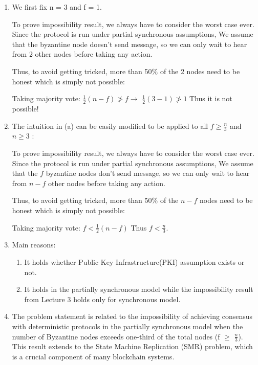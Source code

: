 \documentclass{article}
\begin{document}
\begin{enumerate}
\item %
    We first fix n = 3 and f = 1.
    
    To prove impossibility result, we always have to consider the worst case ever. Since the protocol is run under partial synchronous assumptions, We assume that the byzantine node doesn't send message, so we can only wait to hear from 2 other nodes before taking any action.
    
    Thus, to avoid getting tricked, more than 50\% of the 2 nodes need to be honest which is simply not possible:
    
    Taking majority vote: $ \frac{1}{2}(n-f) \ngtr f \longrightarrow$
    $ \frac{1}{2}(3-1) \ngtr 1 $ Thus it is not possible!

\item %
    The intuition in (a) can be easily modified to be applied to all $f \geq \frac{n}{3}$ and $n \geq 3$ :

To prove impossibility result, we always have to consider the worst case ever. Since the protocol is run under partial synchronous assumptions, We assume that the $f$ byzantine nodes don't send message, so we can only wait to hear from $n - f$ other nodes before taking any action.
    
    Thus, to avoid getting tricked, more than 50\% of the $n - f$ nodes need to be honest which is simply not possible:
    
    Taking majority vote: $ f < \frac{1}{2}(n-f) $ Thus $ f < \frac{n}{3}$.

\item %
    Main reasons:
    \begin{enumerate}
        \item It holds whether Public Key Infrastructure(PKI) assumption exists or not.
        \item It holds in the partially synchronous model while the impossibility result from Lecture 3 holds only for synchronous model.
        
    \end{enumerate}

\item %
    The problem statement is related to the impossibility of achieving consensus with deterministic protocols in the partially synchronous model when the number of Byzantine nodes exceeds one-third of the total nodes (f $\geq$ $\frac{n}{3}$). This result extends to the State Machine Replication (SMR) problem, which is a crucial component of many blockchain systems.


\end{enumerate}
\end{document}
